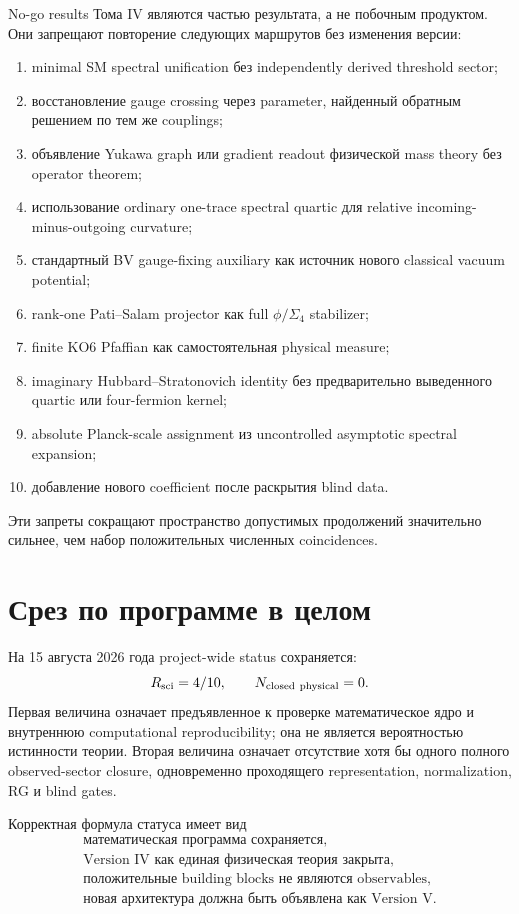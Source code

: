 No-go results Тома IV являются частью результата, а не побочным продуктом.
Они запрещают повторение следующих маршрутов без изменения версии:
\begin{enumerate}
 \item minimal SM spectral unification без independently derived
 threshold sector;
 \item восстановление gauge crossing через parameter, найденный обратным
 решением по тем же couplings;
 \item объявление Yukawa graph или gradient readout физической mass theory
 без operator theorem;
 \item использование ordinary one-trace spectral quartic для relative
 incoming-minus-outgoing curvature;
 \item стандартный BV gauge-fixing auxiliary как источник нового classical
 vacuum potential;
 \item rank-one Pati--Salam projector как full \(\phi/\Sigma_4\) stabilizer;
 \item finite KO6 Pfaffian как самостоятельная physical measure;
 \item imaginary Hubbard--Stratonovich identity без предварительно
 выведенного quartic или four-fermion kernel;
 \item absolute Planck-scale assignment из uncontrolled asymptotic
 spectral expansion;
 \item добавление нового coefficient после раскрытия blind data.
\end{enumerate}

Эти запреты сокращают пространство допустимых продолжений значительно
сильнее, чем набор положительных численных coincidences.

\section{Срез по программе в целом}

На 15 августа 2026 года project-wide status сохраняется:
\begin{equation}
 R_{\rm sci}=4/10,
 \qquad
 N_{\rm closed\ physical}=0.
\end{equation}
Первая величина означает предъявленное к проверке математическое ядро и
внутреннюю computational reproducibility; она не является вероятностью
истинности теории. Вторая величина означает отсутствие хотя бы одного
полного observed-sector closure, одновременно проходящего representation,
normalization, RG и blind gates.

Корректная формула статуса имеет вид
\begin{equation}
 \boxed{
 \begin{gathered}
 \text{математическая программа сохраняется},\\
 \text{Version IV как единая физическая теория закрыта},\\
 \text{положительные building blocks не являются observables},\\
 \text{новая архитектура должна быть объявлена как Version V}.
 \end{gathered}}
 \label{eq:tome-four-final-status}
\end{equation}

